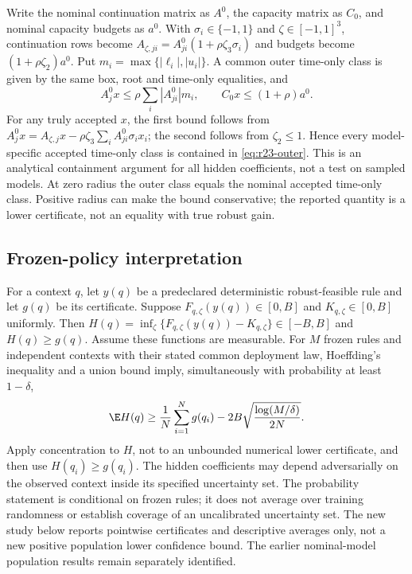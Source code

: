 Write the nominal continuation matrix as $A^0$, the capacity matrix as $C_0$, and nominal capacity budgets as $a^0$. With $\sigma_i\in\{-1,1\}$ and $\zeta\in[-1,1]^3$, continuation rows become $A_{\zeta,ji}=A^0_{ji}(1+\rho\zeta_3\sigma_i)$ and budgets become $(1+\rho\zeta_2)a^0$. Put $m_i=\max\{|\ell_i|,|u_i|\}$. A common outer time-only class is given by the same box, root and time-only equalities, and
\begin{equation}\label{eq:r23-outer}
 A^0_jx\leq\rho\sum_i|A^0_{ji}|m_i,\qquad
 C_0x\leq(1+\rho)a^0.
\end{equation}
For any truly accepted $x$, the first bound follows from
$A^0_jx=A_{\zeta,j}x-\rho\zeta_3\sum_iA^0_{ji}\sigma_ix_i$;
the second follows from $\zeta_2\leq1$. Hence every model-specific accepted time-only class is contained in \eqref{eq:r23-outer}. This is an analytical containment argument for all hidden coefficients, not a test on sampled models. At zero radius the outer class equals the nominal accepted time-only class. Positive radius can make the bound conservative; the reported quantity is a lower certificate, not an equality with true robust gain.

\subsection{Frozen-policy interpretation}
For a context $q$, let $y(q)$ be a predeclared deterministic robust-feasible rule and let $g(q)$ be its certificate. Suppose $F_{q,\zeta}(y(q))\in[0,B]$ and $K_{q,\zeta}\in[0,B]$ uniformly. Then $H(q)=\inf_\zeta\{F_{q,\zeta}(y(q))-K_{q,\zeta}\}\in[-B,B]$ and $H(q)\geq g(q)$. Assume these functions are measurable. For $M$ frozen rules and independent contexts with their stated common deployment law, Hoeffding's inequality and a union bound imply, simultaneously with probability at least $1-\delta$,
\[
 \E H(q)\geq\frac1N\sum_{i=1}^N g(q_i)
       -2B\sqrt{\frac{\log(M/\delta)}{2N}}.
\]
Apply concentration to $H$, not to an unbounded numerical lower certificate, and then use $H(q_i)\geq g(q_i)$. The hidden coefficients may depend adversarially on the observed context inside its specified uncertainty set. The probability statement is conditional on frozen rules; it does not average over training randomness or establish coverage of an uncalibrated uncertainty set. The new study below reports pointwise certificates and descriptive averages only, not a new positive population lower confidence bound. The earlier nominal-model population results remain separately identified.

